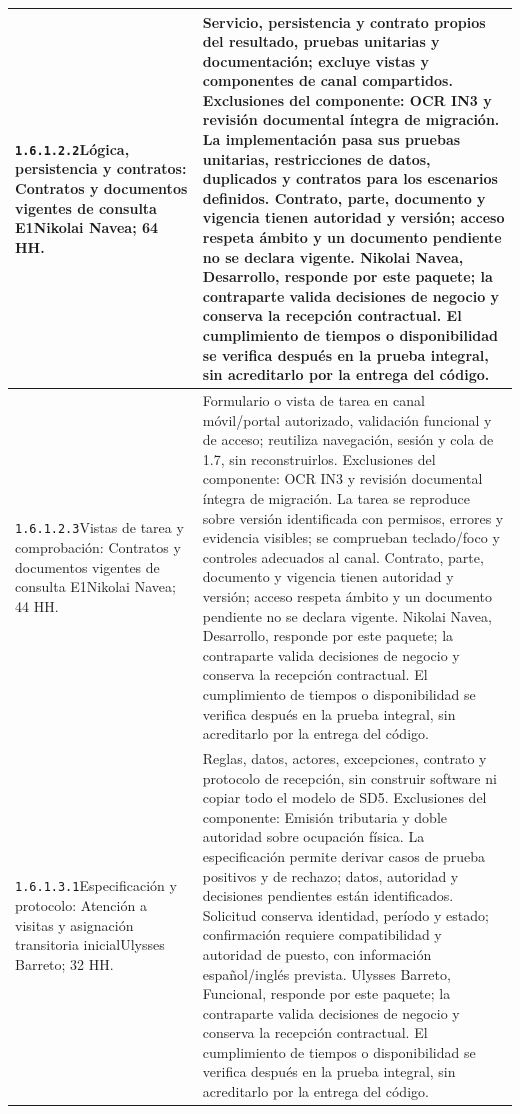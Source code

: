 \begin{longtable}{L{52mm}L{91mm}}
\texttt{1.\allowbreak{}6.\allowbreak{}1.\allowbreak{}2.\allowbreak{}2}\newline Lógica, persistencia y contratos: Contratos y documentos vigentes de consulta E1\newline Nikolai Navea; 64 HH. & Servicio, persistencia y contrato propios del resultado, pruebas unitarias y documentación; excluye vistas y componentes de canal compartidos. Exclusiones del componente: OCR IN3 y revisión documental íntegra de migración. La implementación pasa sus pruebas unitarias, restricciones de datos, duplicados y contratos para los escenarios definidos. Contrato, parte, documento y vigencia tienen autoridad y versión; acceso respeta ámbito y un documento pendiente no se declara vigente. Nikolai Navea, Desarrollo, responde por este paquete; la contraparte valida decisiones de negocio y conserva la recepción contractual. El cumplimiento de tiempos o disponibilidad se verifica después en la prueba integral, sin acreditarlo por la entrega del código.\\\hline
\texttt{1.\allowbreak{}6.\allowbreak{}1.\allowbreak{}2.\allowbreak{}3}\newline Vistas de tarea y comprobación: Contratos y documentos vigentes de consulta E1\newline Nikolai Navea; 44 HH. & Formulario o vista de tarea en canal móvil/portal autorizado, validación funcional y de acceso; reutiliza navegación, sesión y cola de 1.7, sin reconstruirlos. Exclusiones del componente: OCR IN3 y revisión documental íntegra de migración. La tarea se reproduce sobre versión identificada con permisos, errores y evidencia visibles; se comprueban teclado/foco y controles adecuados al canal. Contrato, parte, documento y vigencia tienen autoridad y versión; acceso respeta ámbito y un documento pendiente no se declara vigente. Nikolai Navea, Desarrollo, responde por este paquete; la contraparte valida decisiones de negocio y conserva la recepción contractual. El cumplimiento de tiempos o disponibilidad se verifica después en la prueba integral, sin acreditarlo por la entrega del código.\\\hline
\texttt{1.\allowbreak{}6.\allowbreak{}1.\allowbreak{}3.\allowbreak{}1}\newline Especificación y protocolo: Atención a visitas y asignación transitoria inicial\newline Ulysses Barreto; 32 HH. & Reglas, datos, actores, excepciones, contrato y protocolo de recepción, sin construir software ni copiar todo el modelo de SD5. Exclusiones del componente: Emisión tributaria y doble autoridad sobre ocupación física. La especificación permite derivar casos de prueba positivos y de rechazo; datos, autoridad y decisiones pendientes están identificados. Solicitud conserva identidad, período y estado; confirmación requiere compatibilidad y autoridad de puesto, con información español/inglés prevista. Ulysses Barreto, Funcional, responde por este paquete; la contraparte valida decisiones de negocio y conserva la recepción contractual. El cumplimiento de tiempos o disponibilidad se verifica después en la prueba integral, sin acreditarlo por la entrega del código.\\\hline

\end{longtable}
